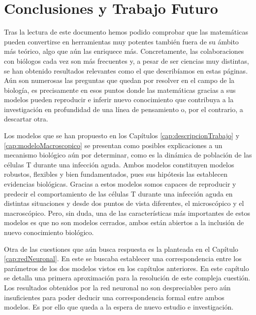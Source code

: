 \chapter{Conclusiones y Trabajo Futuro}
\label{cap:conclusiones}



Tras la lectura de este documento hemos podido comprobar que las matemáticas pueden convertirse en herramientas muy potentes también fuera de su ámbito más teórico, algo que aún las enriquece más. Concretamente, las colaboraciones con biólogos cada vez son más frecuentes y, a pesar de ser ciencias muy distintas, se han obtenido resultados relevantes como el que describíamos en estas páginas. Aún son numerosas las preguntas que quedan por resolver en el campo de la biología, es precisamente en esos puntos donde las matemáticas gracias a sus modelos pueden reproducir e inferir nuevo conocimiento que contribuya a la investigación en profundidad de una línea de pensamiento o, por el contrario, a descartar otra. 

Los modelos que se han propuesto en los Capítulos \ref{cap:descripcionTrabajo} y \ref{cap:modeloMacroscopico} se presentan como posibles explicaciones a un mecanismo biológico aún por determinar, como es la dinámica de población de las células T durante una infección aguda. Ambos modelos constituyen modelos robustos, flexibles y bien fundamentados, pues sus hipótesis las establecen evidencias biológicas. Gracias a estos modelos somos capaces de reproducir y predecir el comportamiento de las células T durante una infección aguda en distintas situaciones y desde dos puntos de vista diferentes, el microscópico y el macroscópico. Pero, sin duda, una de las características más importantes de estos modelos es que no son modelos cerrados, ambos están abiertos a la inclusión de nuevo conocimiento biológico. 

Otra de las cuestiones que aún busca respuesta es la planteada en el Capítulo \ref{cap:redNeuronal}. En este se buscaba establecer una correspondencia entre los parámetros de los dos modelos vistos en los capítulos anteriores. En este capítulo se detalla una primera aproximación para la resolución de este compleja cuestión. Los resultados obtenidos por la red neuronal no son despreciables pero aún insuficientes para poder deducir una correspondencia formal entre ambos modelos. Es por ello que queda a la espera de nuevo estudio e investigación.



